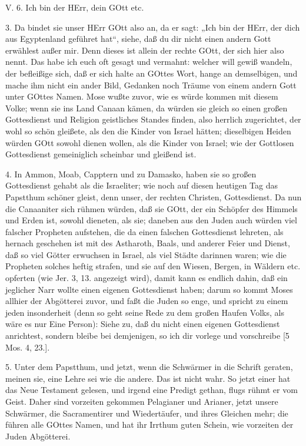\begin{schriftzitat}
V. 6. Ich bin der HErr, dein GOtt etc.
\end{schriftzitat}

3. Da bindet sie unser HErr GOtt also an, da er sagt: „Ich bin der HErr, der dich aus Egyptenland geführet hat“, siehe, daß du dir nicht einen andern Gott erwählest außer mir. Denn dieses ist allein der rechte GOtt, der sich
hier also nennt. Das habe ich euch oft gesagt und vermahnt: welcher will gewiß wandeln, der befleißige sich, daß er sich halte an GOttes Wort, hange an demselbigen, und mache ihm nicht ein ander Bild, Gedanken noch Träume von einem andern Gott unter GOttes Namen. Mose wußte zuvor, wie es würde kommen mit diesem Volke; wenn sie ins Land Canaan kämen, da würden sie gleich so einen großen Gottesdienst und Religion geistliches Standes finden, also herrlich zugerichtet, der wohl so schön gleißete, als den die Kinder von Israel hätten; dieselbigen Heiden würden GOtt sowohl dienen wollen, als die Kinder von Israel; wie der Gottlosen Gottesdienst gemeiniglich scheinbar und gleißend ist.

4. In Ammon, Moab, Capptern und zu Damasko, haben sie so großen Gottesdienst gehabt als die Israeliter; wie noch auf diesen heutigen Tag das Papstthum schöner gleist, denn unser, der rechten Christen, Gottesdienst. Da nun die Canaaniter sich rühmen würden, daß sie GOtt, der ein Schöpfer des Himmels und Erden ist, sowohl dieneten, als sie; daneben aus den Juden auch würden viel falscher Propheten aufstehen, die da einen falschen Gottesdienst lehreten, als hernach geschehen ist mit des Astharoth, Baals, und anderer Feier und Dienst, daß so viel Götter erwuchsen in Israel, als viel Städte darinnen waren; wie die Propheten solches heftig strafen, und sie auf den Wiesen, Bergen, in Wäldern etc. opferten (wie Jer. 3, 13. angezeigt wird), damit kann es endlich dahin, daß ein jeglicher Narr wollte einen eigenen Gottesdienst haben; darum so kommt Moses allhier der Abgötterei zuvor, und faßt die Juden so enge, und spricht zu einem jeden insonderheit (denn so geht seine Rede zu dem großen Haufen Volks, als wäre es nur Eine Person): Siehe zu, daß du nicht einen eigenen Gottesdienst anrichtest, sondern bleibe bei demjenigen, so ich dir vorlege und vorschreibe [5 Mos. 4, 23.].

5. Unter dem Papstthum, und jetzt, wenn die Schwärmer in die Schrift geraten, meinen sie, eine Lehre sei wie die andere. Das ist nicht wahr. So jetzt einer hat das Neue Testament gelesen, und irgend eine Predigt gethan, flugs rühmt er vom Geist. Daher sind vorzeiten gekommen Pelagianer und Arianer, jetzt unsere Schwärmer, die Sacramentirer und Wiedertäufer, und ihres Gleichen mehr; die führen alle GOttes Namen, und hat ihr Irrthum guten Schein, wie vorzeiten der Juden Abgötterei.

